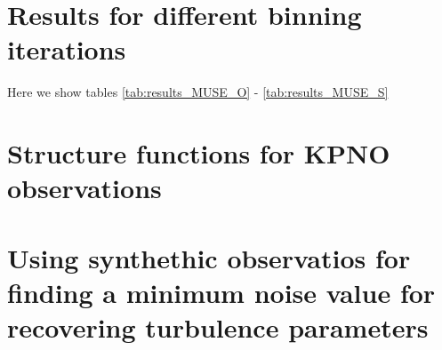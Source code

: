\documentclass[fleqn,usenatbib, useAMS, a4paper]{mnras}
\begin{document}
\section{Results for different binning iterations} \label{apex:multiple_lines_results}

Here we show tables \ref{tab:results_MUSE_O} - \ref{tab:results_MUSE_S}











\section{Structure functions for KPNO observations} \label{apex:kpno_structure_function}

\section{Using synthethic observatios for finding a minimum noise value for recovering turbulence parameters} \label{apex:simulation_noise}



%
\bsp	%
\label{lastpage}
\end{document}
